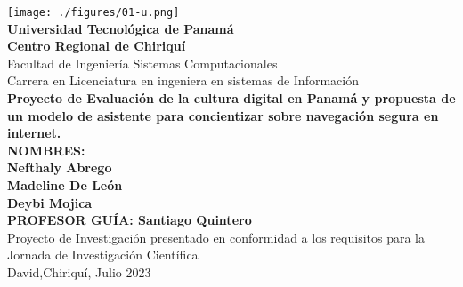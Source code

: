 \documentclass[12pt,letterpaper,fleqn]{report}
\begin{document}
\pagestyle{empty}
\begin{center}
    \parbox[c][\textheight][t]{\textwidth}{
        \begin{center}
            \texttt{[image: ./figures/01-u.png]}\\
            \vspace{0.25cm}
           {\normalsize \bf Universidad Tecnológica de Panamá}\\ \vspace{-0.15cm} 
                {\normalsize \bf Centro Regional de Chiriquí}\\ \vspace{-0.10cm}
            {\normalsize Facultad de Ingeniería Sistemas Computacionales}\\ \vspace{-0.15cm} 
            {\normalsize Carrera en Licenciatura en ingeniera en sistemas de Información}\\
            \vspace{2cm}
            {\normalsize \bf Proyecto de Evaluación de la cultura digital en Panamá y propuesta de un modelo de asistente para concientizar sobre navegación segura en internet.} \\
            \vspace{2cm}
            {\normalsize \bf NOMBRES: } \\
            {\normalsize \bf Nefthaly Abrego } \\
            {\normalsize \bf Madeline De León} \\
            {\normalsize \bf Deybi Mojica    } \\ 
             \vspace{2cm}
            {\normalsize \bf PROFESOR GUÍA: Santiago Quintero} \\
            \vfill
            Proyecto de Investigación presentado en conformidad a los requisitos para la Jornada de Investigación Científica \\
            \vspace{0.5cm}
            David,Chiriquí,  Julio 2023
        \end{center}
        }
\end{center}


\cleardoublepage
\end{document}
